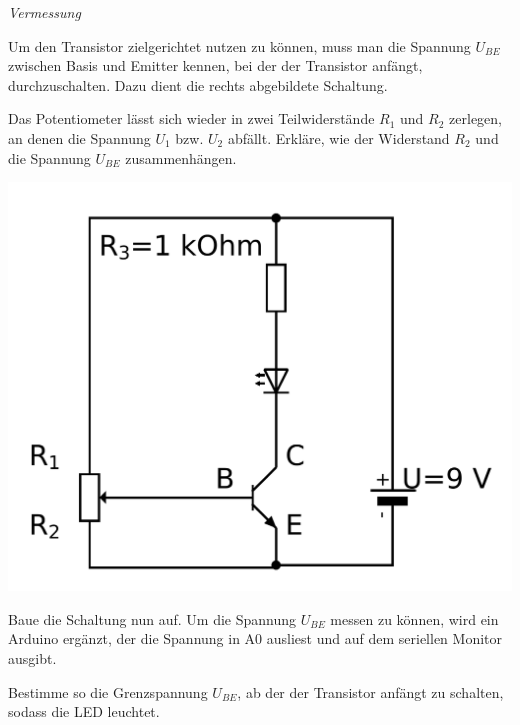 \begin{aufgabe} \emph{Vermessung}
	
	\medskip
	\begin{minipage}{0.58\textwidth}
		Um den Transistor zielgerichtet nutzen zu können, muss man die Spannung $U_{BE}$ zwischen Basis und Emitter kennen, bei der der Transistor anfängt, durchzuschalten. Dazu dient die rechts abgebildete Schaltung.
		
		Das Potentiometer lässt sich wieder in zwei Teilwiderstände $R_1$ und $R_2$ zerlegen, an denen die Spannung $U_1$ bzw. $U_2$ abfällt. Erkläre, wie der Widerstand $R_2$ und die Spannung $U_{BE}$ zusammenhängen.
	\end{minipage}
	\hfill
	\begin{minipage}{0.38\textwidth}
		\centering
		\includegraphics[width=\textwidth]{./Zeichnungen/Schaltplan-U-BE-Messung1.png}
	\end{minipage}
	
	\begin{minipage}[c][8cm][t]{0.58\textwidth}
		Baue die Schaltung nun auf. Um die Spannung $U_{BE}$ messen zu können, wird ein Arduino ergänzt, der die Spannung in A0 ausliest und auf dem seriellen Monitor ausgibt. 
		
		Bestimme so die Grenzspannung $U_{BE}$, ab der der Transistor anfängt zu schalten, sodass die LED leuchtet.
		

\end{minipage}
\end{aufgabe}
